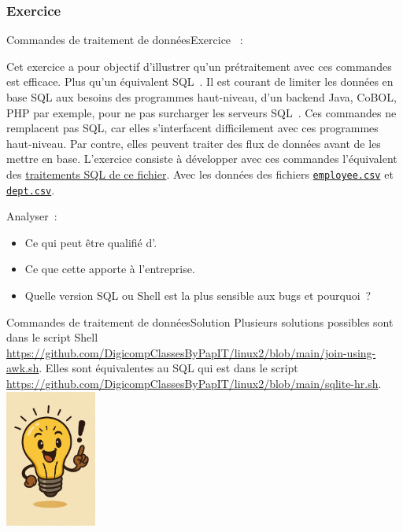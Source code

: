 \documentclass{beamer}
\begin{document}
    \subsubsection{Exercice}\label{subsubsec:data-exercice}
    \begin{frame}{Commandes de traitement de données}{Exercice \execcounterdispinc{}~:}
        \begin{footnotesize}
            Cet exercice a pour objectif d'illustrer qu'un prétraitement avec ces commandes est efficace.
            Plus qu'un équivalent SQL~.
            \bigbreak
            Il est courant de limiter les données en base SQL aux besoins des programmes haut-niveau, d'un backend Java, CoBOL, PHP par exemple, pour ne pas surcharger les serveurs SQL~.
            \bigbreak
            Ces commandes ne remplacent pas SQL, car elles s'interfacent difficilement avec ces programmes haut-niveau.
            \bigbreak
            Par contre, elles peuvent traiter des flux de données avant de les mettre en base.
            L'exercice consiste à développer avec ces commandes l'équivalent des \href{https://github.com/DigicompClassesByPapIT/linux2/blob/main/sqlite-hr.sh}{traitements SQL de ce fichier}.
            Avec les données des fichiers \href{https://github.com/DigicompClassesByPapIT/linux2/blob/main/employee.csv}{\lstinline{employee.csv}} et \href{https://github.com/DigicompClassesByPapIT/linux2/blob/main/dept.csv}{\lstinline{dept.csv}}.

            Analyser~:
            \begin{itemize}
                \item Ce qui peut être qualifié d'.
                \item Ce que cette  apporte à l'entreprise.
                \item Quelle version SQL ou Shell est la plus sensible aux bugs et pourquoi~?
            \end{itemize}
        \end{footnotesize}
    \end{frame}

    \begin{frame}{Commandes de traitement de données}{Solution}
        Plusieurs solutions possibles sont dans le script Shell \url{https://github.com/DigicompClassesByPapIT/linux2/blob/main/join-using-awk.sh}.
        \bigbreak
        Elles sont équivalentes au SQL qui est dans le script \url{https://github.com/DigicompClassesByPapIT/linux2/blob/main/sqlite-hr.sh}.
        \bigbreak
        \centering
        \includegraphics[width=3cm]{image/clever-lightbulb}
    \end{frame}
\end{document}
